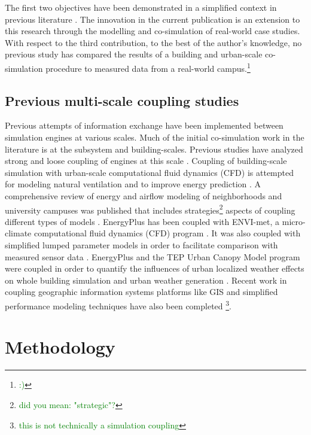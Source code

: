 \documentclass{tBPS2e}
\theoremstyle{plain}
\theoremstyle{definition}
\theoremstyle{remark}
\newcommand{\noteDT}[1]{\footnote{\textcolor{green}{#1}}}
\begin{document}
The first two objectives have been demonstrated in a simplified context in previous literature \citep{thomas2014multiscale,Miller:2015vk}. The innovation in the current publication is an extension to this research through the modelling and co-simulation of real-world case studies. With respect to the third contribution, to the best of the author's knowledge, no previous study has compared the results of a building and urban-scale co-simulation procedure to measured data from a real-world campus.\noteDT{:)} 

\subsection{Previous multi-scale coupling studies}
Previous attempts of information exchange have been implemented between simulation engines at various scales. Much of the initial co-simulation work in the literature is at the subsystem and building-scales. Previous studies have analyzed strong and loose coupling of engines at this scale \citep{Trcka:2010cr,Wetter:2011kh}. Coupling of building-scale simulation with urban-scale computational fluid dynamics (CFD) is attempted for modeling natural ventilation \citep{Zhang:2013vx} and to improve energy prediction \citep{Bouyer:2011eha}. A comprehensive review of energy and airflow modeling of neighborhoods and university campuses was published that includes strategies\noteDT{did you mean: "strategic"?} aspects of coupling different types of models \citep{Srebric:2015gq}. EnergyPlus has been coupled with ENVI-met, a micro-climate computational fluid dynamics (CFD) program \citep{Yang:2012cr}. It was also coupled with simplified lumped parameter models in order to facilitate comparison with measured sensor data \citep{Martin:2015fj}. EnergyPlus and the TEP Urban Canopy Model program were coupled in order to quantify the influences of urban localized weather effects on whole building simulation \citep{Bueno:2011hi} and urban weather generation \citep{Bueno:2013hh}. Recent work in coupling geographic information systems platforms like GIS and simplified performance modeling techniques have also been completed \citep{Fonseca:2015bm}\noteDT{this is not technically a simulation coupling}.

\section{Methodology}\label{Methodology}
\end{document}
